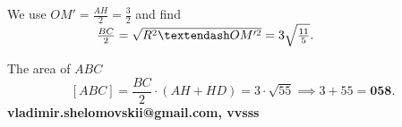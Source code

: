 \begin{enumerate}
 We use $OM' = \frac{AH}{2} = \frac {3}{2}$ and find $\hspace{25mm} \frac{BC}{2} = \sqrt{R^2 – OM'^2} = 3 \sqrt {\frac {11}{5}}.$

 The area of $ABC$
 \[[ABC]=\frac{BC}{2} \cdot (AH + HD) = 3\cdot \sqrt{55}  \implies 3+55 = \boldsymbol{\boxed{058}}.\]\textbf{vladimir.shelomovskii@gmail.com, vvsss}

 


\end{enumerate}